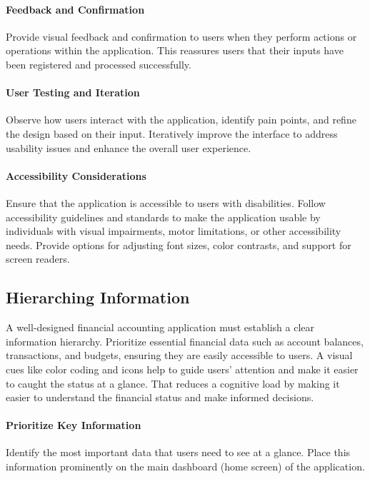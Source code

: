 \paragraph{Feedback and Confirmation}
Provide visual feedback and confirmation to users when they perform actions or operations within the application. This 
reassures users that their inputs have been registered and processed successfully. 

\paragraph{User Testing and Iteration}
Observe how users interact with the application, identify pain points, and refine the design based on their input. 
Iteratively improve the interface to address usability issues and enhance the overall user experience.

\paragraph{Accessibility Considerations}
Ensure that the application is accessible to users with disabilities. Follow 
accessibility guidelines and standards to make the application usable by individuals with visual impairments, 
motor limitations, or other accessibility needs. Provide options for adjusting font sizes, color contrasts, and 
support for screen readers.

\subsection{Hierarching Information}

A well-designed financial accounting application must establish a clear information hierarchy. Prioritize essential 
financial data such as account balances, transactions, and budgets, ensuring they are easily accessible to users. 
A visual cues like color coding and icons help to guide users' attention and make it easier to caught the status at a 
glance. That reduces a cognitive load by making it easier to understand the financial status and make informed decisions.

\paragraph{Prioritize Key Information}
Identify the most important data that users need to see at a glance. Place this information prominently on the main 
dashboard (home screen) of the application.

